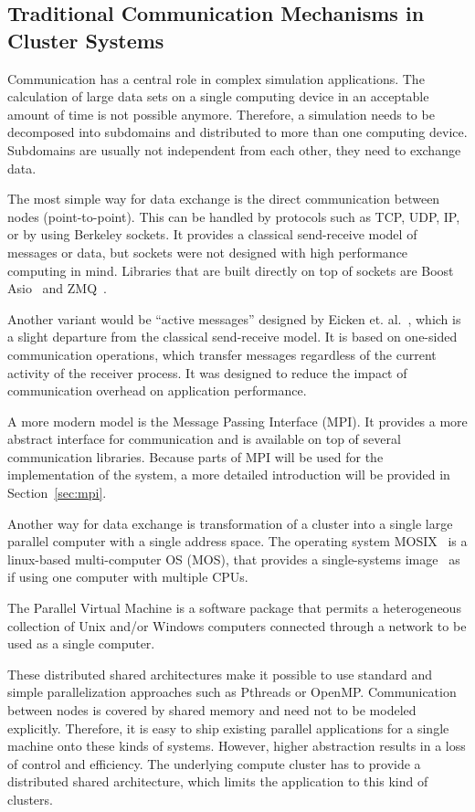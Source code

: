 \subsection{Traditional Communication Mechanisms in Cluster Systems}
\label{sec:communication}
Communication has a central role in complex simulation
applications. 
The calculation of large data sets on a single computing
device in an acceptable amount of time is not possible anymore.
Therefore, a simulation needs to be decomposed into subdomains and
distributed to more than one computing device. Subdomains are usually
not independent from each other, they need to exchange data.

The most simple way for data exchange is the direct communication
between nodes (point-to-point).  This can be handled by protocols such
as TCP, UDP, IP, or by using Berkeley sockets. It provides a classical
send-receive model of messages or data, but sockets were not designed
with high performance computing in mind. Libraries that are built
directly on top of sockets are Boost Asio~\cite{ref:boost_asio} and
ZMQ~\cite{ref:zmq}.

Another variant would be ``active messages'' designed by Eicken
et. al.~\cite{ref:am}, which is a slight departure from the classical
send-receive model. It is based on one-sided communication operations,
which transfer messages regardless of the current activity of the
receiver process. It was designed to reduce the impact of
communication overhead on application performance.

A more modern model is the Message Passing Interface (MPI). It
provides a more abstract interface for communication and is available
on top of several communication libraries. Because parts of MPI will
be used for the implementation of the system, a more detailed
introduction will be provided in Section~\ref{sec:mpi}.

Another way for data exchange is transformation of a cluster into a
single large parallel computer with a single address space.  The
operating system MOSIX~\cite{ref:mosix} is a linux-based
multi-computer OS (MOS), that provides a single-systems
image~\cite{ref:single_system_image} as if using one computer with
multiple CPUs.

The Parallel Virtual Machine\cite{ref:pvm} is a
software package that permits a heterogeneous collection of Unix
and/or Windows computers connected through a network to be used as a
single computer.

These distributed shared architectures make it possible to use
standard and simple parallelization approaches such as Pthreads or
OpenMP.  Communication between nodes is covered by shared memory and
need not to be modeled explicitly.  Therefore, it is easy to ship
existing parallel applications for a single machine onto these kinds
of systems. However, higher abstraction results in a loss of control
and efficiency. The underlying compute cluster has to provide a
distributed shared architecture, which limits the application to this
kind of clusters.

